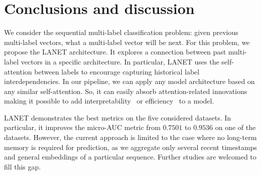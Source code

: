 \documentclass[runningheads]{llncs}
\begin{document}


\section{Conclusions and discussion}

We consider the sequential multi-label classification problem: given previous multi-label vectors, what a multi-label vector will be next. 
For this problem, we propose the LANET architecture. It explores a connection between past multi-label vectors in a  specific architecture.
In particular, LANET uses the self-attention between labels to encourage capturing historical label interdependencies.
In our pipeline, we can apply any model architecture based on any similar self-attention. 
So, it can easily absorb attention-related innovations making it possible to add interpretability~\cite{serrano2019attention} or efficiency~\cite{tay2022efficient} to a model.

LANET demonstrates the best metrics on the five considered datasets. In particular, it improves the micro-AUC metric from $0.7501$ to $0.9536 $ on one of the datasets. 
However, the current approach is limited to the case where no long-term memory is required for prediction, as we aggregate only several recent timestamps and general embeddings of a particular sequence.
Further studies are welcomed to fill this gap.
\end{document}
